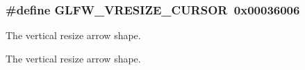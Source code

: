\subsubsection[{G\+L\+F\+W\+\_\+\+V\+R\+E\+S\+I\+Z\+E\+\_\+\+C\+U\+R\+S\+O\+R}]{\setlength{\rightskip}{0pt plus 5cm}\#define G\+L\+F\+W\+\_\+\+V\+R\+E\+S\+I\+Z\+E\+\_\+\+C\+U\+R\+S\+O\+R~0x00036006}\label{group__shapes_gaf024f0e1ff8366fb2b5c260509a1fce5}


The vertical resize arrow shape. 

The vertical resize arrow shape. 